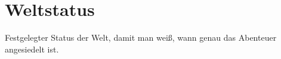 {\let\clearpage\relax\chapter{Weltstatus}}
Festgelegter Status der Welt, damit man weiß, wann genau das Abenteuer angesiedelt ist.